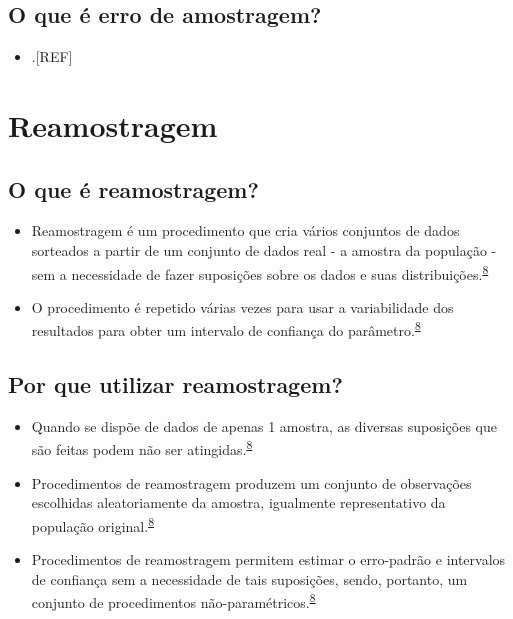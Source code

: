 \documentclass[
  a4paper,
]{book}
\providecommand{\tightlist}{%
  \setlength{\itemsep}{0pt}\setlength{\parskip}{0pt}}
\begin{document}
\hypertarget{o-que-uxe9-erro-de-amostragem}{%
\subsection{O que é erro de amostragem?}\label{o-que-uxe9-erro-de-amostragem}}

\begin{itemize}
\tightlist
\item
  .{[}REF{]}
\end{itemize}

\hypertarget{reamostragem}{%
\section{Reamostragem}\label{reamostragem}}

\hypertarget{o-que-uxe9-reamostragem}{%
\subsection{O que é reamostragem?}\label{o-que-uxe9-reamostragem}}

\begin{itemize}
\item
  Reamostragem é um procedimento que cria vários conjuntos de dados sorteados a partir de um conjunto de dados real - a amostra da população - sem a necessidade de fazer suposições sobre os dados e suas distribuições.\textsuperscript{\protect\hyperlink{ref-Bland2015}{8}}
\item
  O procedimento é repetido várias vezes para usar a variabilidade dos resultados para obter um intervalo de confiança do parâmetro.\textsuperscript{\protect\hyperlink{ref-Bland2015}{8}}
\end{itemize}

\hypertarget{por-que-utilizar-reamostragem}{%
\subsection{Por que utilizar reamostragem?}\label{por-que-utilizar-reamostragem}}

\begin{itemize}
\item
  Quando se dispõe de dados de apenas 1 amostra, as diversas suposições que são feitas podem não ser atingidas.\textsuperscript{\protect\hyperlink{ref-Bland2015}{8}}
\item
  Procedimentos de reamostragem produzem um conjunto de observações escolhidas aleatoriamente da amostra, igualmente representativo da população original.\textsuperscript{\protect\hyperlink{ref-Bland2015}{8}}
\item
  Procedimentos de reamostragem permitem estimar o erro-padrão e intervalos de confiança sem a necessidade de tais suposições, sendo, portanto, um conjunto de procedimentos não-paramétricos.\textsuperscript{\protect\hyperlink{ref-Bland2015}{8}}
\end{itemize}
\end{document}
